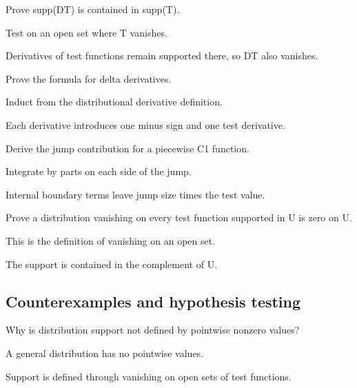 \begin{exercise}\label{exr:iii17-expand-06}
Prove supp(DT) is contained in supp(T).
\end{exercise}
\begin{hint}
Test on an open set where T vanishes.
\end{hint}
\begin{solution}
Derivatives of test functions remain supported there, so DT also vanishes.
\end{solution}

\begin{exercise}\label{exr:iii17-expand-07}
Prove the formula for delta derivatives.
\end{exercise}
\begin{hint}
Induct from the distributional derivative definition.
\end{hint}
\begin{solution}
Each derivative introduces one minus sign and one test derivative.
\end{solution}

\begin{exercise}\label{exr:iii17-expand-08}
Derive the jump contribution for a piecewise C1 function.
\end{exercise}
\begin{hint}
Integrate by parts on each side of the jump.
\end{hint}
\begin{solution}
Internal boundary terms leave jump size times the test value.
\end{solution}

\begin{exercise}[Localization]\label{exr:iii17-expand-09}
Prove a distribution vanishing on every test function supported in U is zero on U.
\end{exercise}
\begin{hint}
This is the definition of vanishing on an open set.
\end{hint}
\begin{solution}
The support is contained in the complement of U.
\end{solution}

\subsection*{Counterexamples and hypothesis testing}

\begin{exercise}\label{exr:iii17-expand-10}
Why is distribution support not defined by pointwise nonzero values?
\end{exercise}
\begin{hint}
A general distribution has no pointwise values.
\end{hint}
\begin{solution}
Support is defined through vanishing on open sets of test functions.
\end{solution}

